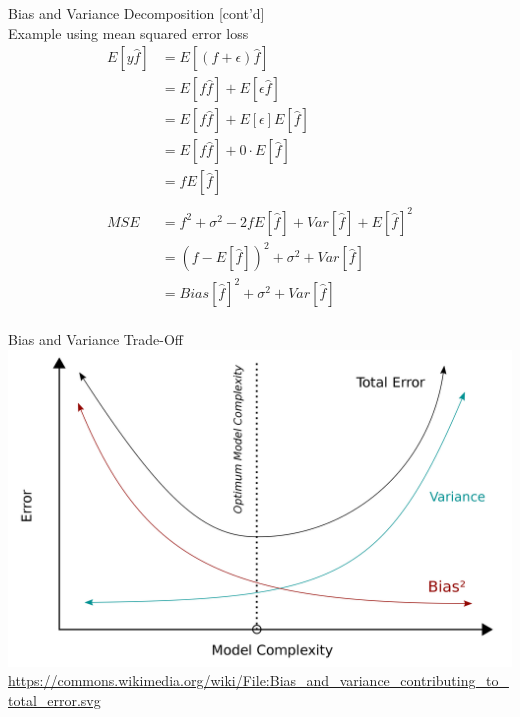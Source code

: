 \documentclass[ignorenonframetext,xcolor=x11names]{beamer}
\begin{document}
\begin{frame}{Bias and Variance Decomposition \small [cont'd] \\ \small Example using mean squared error loss}
\begin{align*}
E[y \hat{f}] &= E[(f + \epsilon)\hat{f}] \\
             &= E[f \hat{f}] + E[\epsilon \hat{f}] \\
             &= E[f \hat{f}] + E[\epsilon] E[\hat{f}] \\
             &= E[f \hat{f}] + 0 \cdot E[\hat{f}] \\
             &= f E[\hat{f}] \\
\\
MSE &= f^2 + \sigma^2 - 2 f E[\hat{f}] + Var[\hat{f}] + E[\hat{f}]^2 \\
    &= (f - E[\hat{f}])^2 + \sigma^2 + Var[\hat{f}] \\
    &= Bias[\hat{f}]^2 + \sigma^2 + Var[\hat{f}] \\
\end{align*}
\end{frame}

\begin{frame}{Bias and Variance Trade-Off}
\centering
\includegraphics[width=\textwidth]{bias_variance.png}\\

\scriptsize \url{https://commons.wikimedia.org/wiki/File:Bias_and_variance_contributing_to_total_error.svg}
\end{frame}
\end{document}
